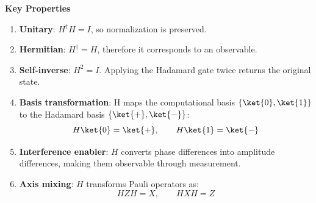 \highspace
\begin{flushleft}
    \textcolor{Green3}{ \textbf{Key Properties}}
\end{flushleft}
\begin{enumerate}
    \item \textbf{Unitary}: $H^\dagger H = I$, so normalization is preserved.
    
    \item \textbf{Hermitian}: $H^\dagger = H$, therefore it corresponds to an observable.
    
    \item \textbf{Self-inverse}: $H^2 = I$. Applying the Hadamard gate twice returns the original state.
    
    \item \textbf{Basis transformation}: H maps the computational basis $\left\{\ket{0}, \ket{1}\right\}$ to the Hadamard basis $\left\{\ket{+}, \ket{-}\right\}$:
    \begin{equation*}
        H\ket{0} = \ket{+}, \hspace{2em} H\ket{1} = \ket{-}
    \end{equation*}
    
    \item \textbf{Interference enabler}: $H$ converts phase differences into amplitude differences, making them observable through measurement.
    
    \item \textbf{Axis mixing}: $H$ transforms Pauli operators as:
    \begin{equation*}
        HZH = X, \hspace{2em} HXH = Z
    \end{equation*}
\end{enumerate}